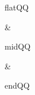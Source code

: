 \documentclass{article}
\begin{document}
flatQQ
\begin{tenkz}[rows={wire}]  &  \end{tenkz}
midQQ
\begin{tenkz}[frame=vertical, rows={wire}]  &  \end{tenkz}
endQQ
\end{document}
